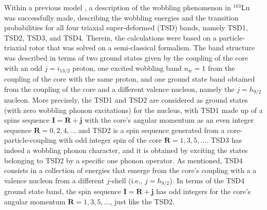 \documentclass[%
 reprint,
 amsmath,
 amssymb,
 aps,
 floatfix,
]{revtex4-2}
\begin{document}
Within a previous model \cite{raduta2020towards}, a description of the wobbling phenomenon in $^{163}$Lu was successfully made, describing the wobbling energies and the transition probabilities for all four triaxial super-deformed (TSD) bands, namely TSD1, TSD2, TSD3, and TSD4. Therein, the calculations were based on a particle-triaxial rotor that was solved on a semi-classical formalism. The band structure was described in terms of two ground states given by the coupling of the core with an odd $j=i_{13/2}$ proton, one excited wobbling band $n_w=1$ from the coupling of the core with the same proton, and one ground state band obtained from the coupling of the core and a different valence nucleon, namely the $j=h_{9/2}$ nucleon. More precisely, the TSD1 and TSD2 are considered as ground states (with zero wobbling phonon excitations) for the nucleus, with TSD1 made up of a spins sequence $\mathbf{I}=\mathbf{R}+\mathbf{j}$ with the core's angular momentum as an even integer sequence $\mathbf{R}=0,2,4,\dots$ and TSD2 is a spin sequence generated from a core-particle-coupling with odd integer spin of the core $\mathbf{R}=1,3,5,\dots$. TSD3 has indeed a wobbling phonon character, and it is obtained by exciting the states belonging to TSD2 by a specific one phonon operator. As mentioned, TSD4 consists in a collection of energies that emerge from the core's coupling with a a valence nucleon from a different $j$-shell (i.e., $j=h_{9/2}$). In terms of the TSD4 ground state band, the spin sequence $\mathbf{I}=\mathbf{R}+\mathbf{j}$ has odd integers for the core's angular momentum $\mathbf{R}=1,3,5,\dots$, just like the TSD2.
\end{document}
